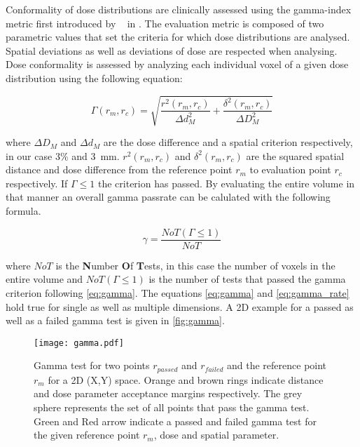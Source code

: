 Conformality of dose distributions are clinically assessed using the gamma-index metric first introduced by \citeauthor{low_technique_1998}~\cite{low_technique_1998} in \citeyear{low_technique_1998}. 
The evaluation metric is composed of two parametric values that set the criteria for which dose distributions are analysed. 
Spatial deviations as well as deviations of dose are respected when analysing. 
Dose conformality is assessed by analyzing each individual voxel of a given dose distribution using the following equation:

\begin{equation}\label{eq:gamma}
    \Gamma (r_m, r_c) = \sqrt{\frac{r^2(r_m,r_c)}{\Delta d^2_M} + \frac{\delta ^2(r_m,r_c)}{\Delta D^2_M}}
\end{equation}

where $\Delta D_M$ and $\Delta d_M$ are the dose difference and a spatial criterion respectively, in our case 3\% and 3~mm.  $r^2(r_m,r_c)$ and $\delta ^2(r_m,r_c)$ are the squared spatial distance and dose difference from the reference point $r_m$ to evaluation point $r_c$ respectively. 
If $\Gamma \leq 1$ the criterion has passed. By evaluating the entire volume in that manner an overall gamma passrate can be calulated with the following formula. 

\begin{equation}\label{eq:gamma_rate}
    \gamma = \frac{NoT(\Gamma \leq 1)}{NoT}
\end{equation}

where $NoT$ is the \textbf{N}umber \textbf{O}f \textbf{T}ests, in this case the number of voxels in the entire volume and $NoT(\Gamma \leq 1)$ is the number of tests that passed the gamma criterion following \autoref{eq:gamma}. The equations \autoref{eq:gamma} and \autoref{eq:gamma_rate} hold true for single as well as multiple dimensions. A 2D example for a passed as well as a failed gamma test is given in \autoref{fig:gamma}. 

\begin{figure}
    \centering
    \texttt{[image: gamma.pdf]}
    \caption{Gamma test for two points $r_{passed}$ and $r_{failed}$ and the reference point $r_m$ for a 2D (X,Y) space. Orange and brown rings indicate distance and dose parameter acceptance margins respectively. The grey sphere represents the set of all points that pass the gamma test. Green and Red arrow indicate a passed and failed gamma test for the given reference point $r_m$, dose and spatial parameter.}\label{fig:gamma}
\end{figure}

